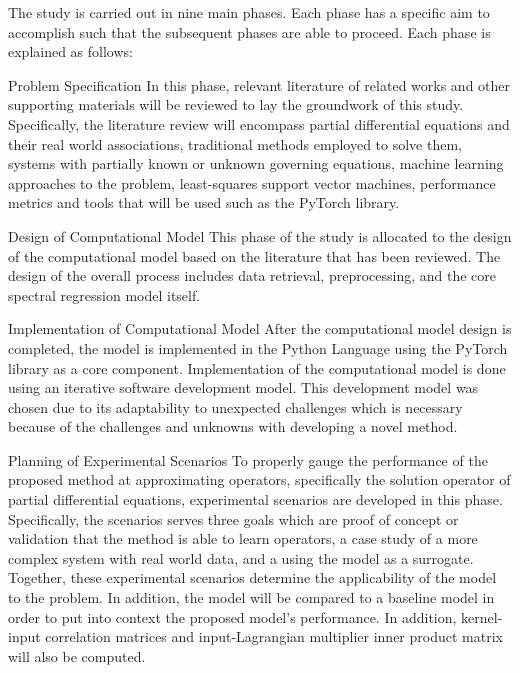 The study is carried out in nine main phases. Each phase has a specific aim to accomplish such that the subsequent phases are able to proceed. Each phase is explained as follows:
\begin{numdesc}
      \item[Problem Specification]
      In this phase, relevant literature of related works and other supporting materials will be reviewed to lay the groundwork of this study. Specifically, the literature review will encompass partial differential equations and their real world associations, traditional methods employed to solve them, systems with partially known or unknown governing equations, machine learning approaches to the problem, least-squares support vector machines, performance metrics and tools that will be used such as the PyTorch library.

      \item[Design of Computational Model]
      This phase of the study is allocated to the design of the computational model based on the literature that has been reviewed. The design of the overall process includes data retrieval, preprocessing, and the core spectral regression model itself.

      \item[Implementation of Computational Model]
      After the computational model design is completed, the model is implemented in the Python Language using the PyTorch library as a core component. Implementation of the computational model is done using an iterative software development model. This development model was chosen due to its adaptability to unexpected challenges which is necessary because of the challenges and unknowns with developing a novel method.

      \item[Planning of Experimental Scenarios]
      To properly gauge the performance of the proposed method at approximating operators, specifically the solution operator of partial differential equations, experimental scenarios are developed in this phase. Specifically, the scenarios serves three goals which are proof of concept or validation that the method is able to learn operators, a case study of a more complex system with real world data, and a using the model as a surrogate. Together, these experimental scenarios determine the applicability of the model to the problem. In addition, the model will be compared to a baseline model in order to put into context the proposed model's performance. In addition, kernel-input correlation matrices and input-Lagrangian multiplier inner product matrix will also be computed.


\end{numdesc}
